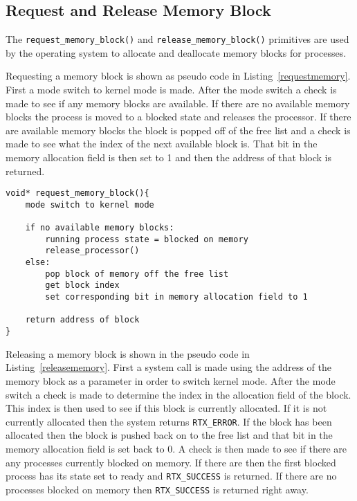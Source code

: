 \documentclass[oneside]{article}
\begin{document}
\subsection*{Request and Release Memory Block}
The \texttt{request\_memory\_block()} and \texttt{release\_memory\_block()} primitives 
are used by the operating system to allocate and deallocate memory blocks for processes.

Requesting a memory block is shown as pseudo code in Listing~\ref{requestmemory}. First a 
mode switch to kernel mode is made. After the mode switch a check is made to see if any 
memory blocks are available. If there are no available memory blocks the process is moved 
to a blocked state and releases the processor. If there are available memory blocks the 
block is popped off of the free list and a check is made to see what the index of the next 
available block is. That bit in the memory allocation field is then set to 1 and then the 
address of that block is returned.

\begin{lstlisting}
void* request_memory_block(){
    mode switch to kernel mode

    if no available memory blocks:
        running process state = blocked on memory
        release_processor()
    else:
        pop block of memory off the free list        
        get block index
        set corresponding bit in memory allocation field to 1

    return address of block
}
\end{lstlisting}

Releasing a memory block is shown in the pseudo code in Listing~\ref{releasememory}. First a 
system call is made using the address of the memory block as a parameter in order to switch
kernel mode. After the mode switch a check is made to determine the index in the allocation 
field of the block. This index is then used to see if this block is currently allocated. If 
it is not currently allocated then the system returns \texttt{RTX\_ERROR}. If the block has 
been allocated then the block is pushed back on to the free list and that bit in the memory 
allocation field is set back to 0. A check is then made to see if there are any processes 
currently blocked on memory. If there are then the first blocked process has its state set 
to ready and \texttt{RTX\_SUCCESS} is returned. If there are no processes blocked on memory 
then \texttt{RTX\_SUCCESS} is returned right away.
\end{document}
